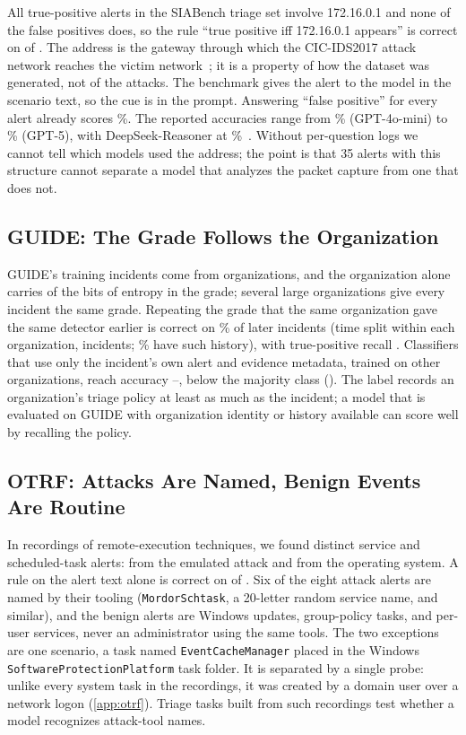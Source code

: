 All \siaTP{} true-positive alerts in the SIABench triage set involve 172.16.0.1 and none of the \siaMajority{} false positives does, so the rule ``true positive iff 172.16.0.1 appears'' is correct on \siaRule{} of \siaN{}. The address is the gateway through which the CIC-IDS2017 attack network reaches the victim network~\citep{cicids2017}; it is a property of how the dataset was generated, not of the attacks. The benchmark gives the alert to the model in the scenario text, so the cue is in the prompt. Answering ``false positive'' for every alert already scores \siaMajorityPct\%. The reported accuracies range from \siaMini\% (GPT-4o-mini) to \siaGptFive\% (GPT-5), with DeepSeek-Reasoner at \siaDeepSeek\%~\citep{siabench}. Without per-question logs we cannot tell which models used the address; the point is that 35 alerts with this structure cannot separate a model that analyzes the packet capture from one that does not.

\subsection{GUIDE: The Grade Follows the Organization}
\label{sec:guide}

GUIDE's \gIncidents{} training incidents come from \gOrgs{} organizations, and the organization alone carries \gMIorg{} of the \gH{} bits of entropy in the grade; several large organizations give every incident the same grade. Repeating the grade that the same organization gave the same detector earlier is correct on \gHistPct\% of later incidents (time split within each organization, \gDev{} incidents; \gSeen\% have such history), with true-positive recall \gHistTP. Classifiers that use only the incident's own alert and evidence metadata, trained on other organizations, reach accuracy \gHeldMin--\gHeldMax, below the majority class (\gHeldMajority). The label records an organization's triage policy at least as much as the incident; a model that is evaluated on GUIDE with organization identity or history available can score well by recalling the policy.

\subsection{OTRF: Attacks Are Named, Benign Events Are Routine}
\label{sec:otrf}

In \otRec{} recordings of remote-execution techniques, we found \otN{} distinct service and scheduled-task alerts: \otAttack{} from the emulated attack and \otBenign{} from the operating system. A rule on the alert text alone is correct on \otRuleCorrect{} of \otN. Six of the eight attack alerts are named by their tooling (\texttt{MordorSchtask}, a 20-letter random service name, and similar), and the benign alerts are Windows updates, group-policy tasks, and per-user services, never an administrator using the same tools. The two exceptions are one scenario, a task named \texttt{EventCacheManager} placed in the Windows \texttt{SoftwareProtectionPlatform} task folder. It is separated by a single probe: unlike every system task in the recordings, it was created by a domain user over a network logon (\cref{app:otrf}). Triage tasks built from such recordings test whether a model recognizes attack-tool names.

